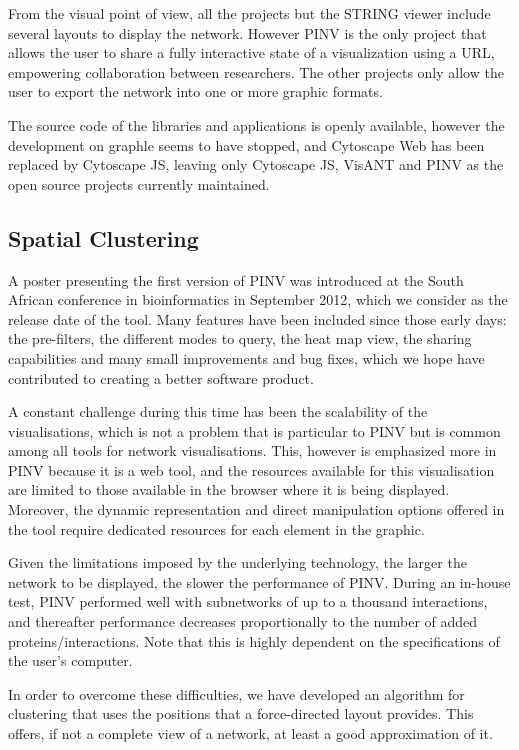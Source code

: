 From the visual point of view, all the projects but the STRING viewer include several layouts to display the network. However PINV is the only project that allows the user to share a fully interactive state of a visualization using a URL,  empowering collaboration between researchers. The other projects only allow the user to export the network into one or more graphic formats.

The source code of the libraries and applications is openly available, however the development on graphle seems to have stopped, and Cytoscape Web has been replaced by Cytoscape JS, leaving only Cytoscape JS, VisANT and PINV as the open source projects currently maintained. 

\subsection{Spatial Clustering} \label{section:clustering}
A poster presenting the first version of PINV was introduced at the South African conference in bioinformatics in September 2012, which we consider as the release date of the tool. Many features have been included since those early days: the pre-filters, the different modes to query, the heat map view, the sharing capabilities and many small improvements and bug fixes, which we hope have contributed to creating a better software product.

A constant challenge during this time has been the scalability of the visualisations, which is not a problem that is particular to PINV but is common among all tools for network visualisations. This, however is emphasized more in PINV because it is a web tool, and the resources available for this visualisation are limited to those available in the browser where it is being displayed. Moreover, the dynamic representation and direct manipulation options offered in the tool require dedicated resources for each element in the graphic.

Given the limitations imposed by the underlying technology, the larger the network to be displayed, the slower the performance of PINV. During an in-house test, PINV performed well with subnetworks of up to a thousand interactions, and thereafter performance decreases proportionally to the number of added proteins/interactions. Note that this is highly dependent on the specifications of the user's computer. 

In order to overcome these difficulties, we have developed an algorithm for clustering that uses the positions that a force-directed layout provides. This offers, if not a complete view of a network, at least a good approximation of it.

